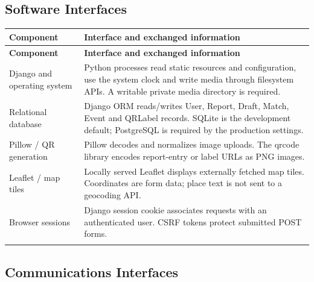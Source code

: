 \documentclass[12pt,a4paper,oneside]{report}
\begin{document}

\subsection{Software Interfaces}

\begin{longtable}{@{}P{0.29\dimexpr\textwidth-12pt\relax}P{0.71\dimexpr\textwidth-12pt\relax}@{}}

\toprule \textbf{Component} & \textbf{Interface and exchanged information} \\ \midrule\endfirsthead

\toprule \textbf{Component} & \textbf{Interface and exchanged information} \\ \midrule\endhead

\bottomrule\endfoot

Django and operating system & Python processes read static resources and configuration, use the system clock and write media through filesystem APIs. A writable private media directory is required. \\ \addlinespace[3pt]

Relational database & Django ORM reads/writes User, Report, Draft, Match, Event and QRLabel records. SQLite is the development default; PostgreSQL is required by the production settings. \\ \addlinespace[3pt]

Pillow / QR generation & Pillow decodes and normalizes image uploads. The qrcode library encodes report-entry or label URLs as PNG images. \\ \addlinespace[3pt]

Leaflet / map tiles & Locally served Leaflet displays externally fetched map tiles. Coordinates are form data; place text is not sent to a geocoding API. \\ \addlinespace[3pt]

Browser sessions & Django session cookie associates requests with an authenticated user. CSRF tokens protect submitted POST forms. \\ \addlinespace[3pt]

\end{longtable}


\subsection{Communications Interfaces}
\end{document}
